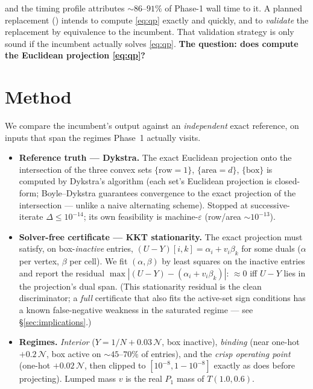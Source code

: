 \documentclass[11pt,a4paper]{article}
\begin{document}
and the timing profile attributes \(\sim\!86\)--\(91\%\) of Phase-1 wall time to it. A planned
replacement () intends to compute
\eqref{eq:qp} exactly and quickly, and to \emph{validate} the replacement by equivalence to the
incumbent. That validation strategy is only sound if the incumbent actually solves
\eqref{eq:qp}. \textbf{The question: does  compute the
Euclidean projection \eqref{eq:qp}?}

\section{Method}
We compare the incumbent's output against an \emph{independent} exact reference, on inputs that
span the regimes Phase~1 actually visits.

\begin{itemize}[leftmargin=1.4em]
\item \textbf{Reference truth --- Dykstra.} The exact Euclidean projection onto the intersection
  of the three convex sets \(\{\text{row}{=}1\}\), \(\{\text{area}{=}d\}\), \(\{\text{box}\}\)
  is computed by Dykstra's algorithm (each set's Euclidean projection is closed-form; Boyle--Dykstra
  guarantees convergence to the exact projection of the intersection --- unlike a naive
  alternating scheme). Stopped at successive-iterate \(\Delta\leq10^{-14}\); its own feasibility
  is machine-\(\varepsilon\) (row/area \(\sim\!10^{-13}\)).
\item \textbf{Solver-free certificate --- KKT stationarity.} The exact projection must satisfy,
  on box-\emph{inactive} entries, \((U-Y)[i,k]=\alpha_i + v_i\beta_k\) for some duals
  (\(\alpha\) per vertex, \(\beta\) per cell). We fit \((\alpha,\beta)\) by least squares on the
  inactive entries and report the residual \(\max|(U-Y)-(\alpha_i+v_i\beta_k)|\): \(\approx 0\)
  iff \(U-Y\) lies in the projection's dual span. (This stationarity residual is the clean
  discriminator; a \emph{full} certificate that also fits the active-set sign conditions has a
  known false-negative weakness in the saturated regime --- see \S\ref{sec:implications}.)
\item \textbf{Regimes.} \emph{Interior} (\(Y=1/N+0.03\,\mathcal N\), box inactive), \emph{binding}
  (near one-hot \(+0.2\,\mathcal N\), box active on \(\sim\!45\)--\(70\%\) of entries), and the
  \emph{crisp operating point} (one-hot \(+0.02\,\mathcal N\), then clipped to
  \([10^{-8},1{-}10^{-8}]\) exactly as  does before projecting). Lumped
  mass \(v\) is the real \(P_1\) mass of \(T(1.0,0.6)\).
\end{itemize}
\end{document}
